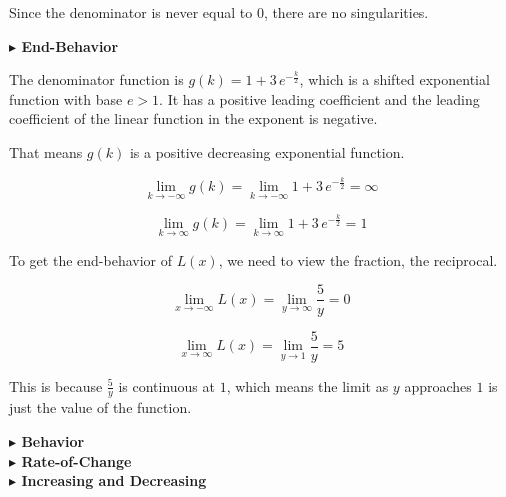 \documentclass{ximera}
\begin{document}
\begin{example}
Since the denominator is never equal to $0$, there are no singularities. 














\textbf{\textcolor{blue!55!black}{$\blacktriangleright$ End-Behavior}} 


The denominator function is $ g(k) = 1 + 3 \, e^{-\tfrac{k}{2}}$, which is a shifted exponential function with base $e > 1$.  It has a positive leading coefficient and the leading coefficient of the linear function in the exponent is negative. 

That means $g(k)$ is a positive decreasing exponential function. 



\[  
\lim\limits_{k \to -\infty}g(k) = \lim\limits_{k \to -\infty}1 + 3 \, e^{-\tfrac{k}{2}} = \infty
\]




\[  
\lim\limits_{k \to \infty}g(k) = \lim\limits_{k \to \infty}1 + 3 \, e^{-\tfrac{k}{2}} = 1
\]




To get the end-behavior of $L(x)$, we need to view the fraction, the reciprocal. 





\[  
\lim\limits_{x \to -\infty}L(x)  = \lim\limits_{y \to \infty}\frac{5}{y} = 0
\]



\[  
\lim\limits_{x \to \infty}L(x)  = \lim\limits_{y \to 1}\frac{5}{y} = 5
\]



This is because $\frac{5}{y}$ is continuous at $1$, which means the limit as $y$ approaches $1$ is just the value of the function. 












\textbf{\textcolor{blue!55!black}{$\blacktriangleright$ Behavior}} \\
\textbf{\textcolor{blue!55!black}{$\blacktriangleright$ Rate-of-Change}} \\
\textbf{\textcolor{blue!55!black}{$\blacktriangleright$ Increasing and Decreasing}}








\end{example}
\end{document}
